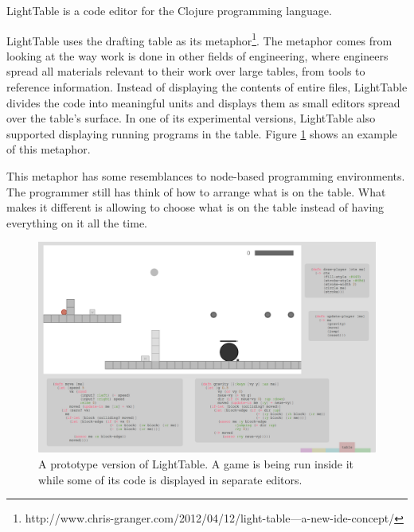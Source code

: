 \documentclass{./llncs2e/llncs}
\begin{document}
	LightTable is a code editor for the Clojure programming language\cite{hickey2008clojure}. 


	LightTable uses the drafting table as its metaphor\footnote{http://www.chris-granger.com/2012/04/12/light-table---a-new-ide-concept/}. 
	The metaphor comes from looking at the way work is done in other fields of engineering, where engineers spread all materials relevant to their work over large tables, from tools to reference information. 
	Instead of displaying the contents of entire files, LightTable divides the code into meaningful units and displays them as small editors spread over the table's surface. 
	In one of its experimental versions, LightTable also supported displaying running programs in the table. 
	Figure \ref{fig:lt:draft:table} shows an example of this metaphor.

	This metaphor has some resemblances to node-based programming environments. 
	The programmer still has think of how to arrange what is on the table.
	What makes it different is allowing to choose what is on the table instead of having everything on it all the time.

	\begin{figure}
	  \centering
	  \includegraphics[width=1.0\textwidth]{img/lt_game_example__inv}
	    \caption{A prototype version of LightTable. A game is being run inside it while some of its code is displayed in separate editors.}
	  \label{fig:lt:draft:table}
	\end{figure} 
\end{document}
